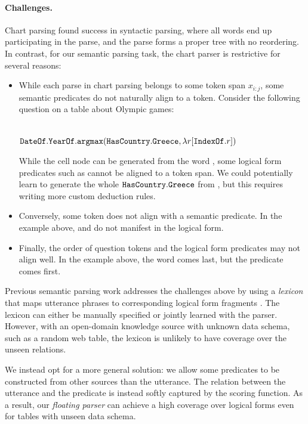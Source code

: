 \paragraph{Challenges.}
Chart parsing found success in syntactic parsing,
where all words end up participating in the parse,
and the parse forms a proper tree with no reordering.
In contrast, for our semantic parsing task,
the chart parser is restrictive for several reasons:
\begin{itemize}
\item
While each parse in chart parsing belongs
to some token span $x_{i:j}$,
some semantic predicates do not naturally align
to a token.
Consider the following question on a table about
Olympic games:
\begin{center}
 \\
${\texttt{Date}}\texttt{Of}.{\texttt{Year}}\texttt{Of}.\texttt{argmax}(\texttt{Has}{\texttt{Country}}.\texttt{Greece}, \lambda r[{\texttt{Index}}\texttt{Of}.r])$
\end{center}
While the cell node  can be generated from
the word , some logical form predicates
such as  cannot be aligned to a token span.
We could potentially learn to generate the whole
$\texttt{Has}{\texttt{Country}}.\texttt{Greece}$ from ,
but this requires writing more custom deduction rules.
\item
Conversely, some token does not align with
a semantic predicate.
In the example above,  and 
do not manifest in the logical form.
\item
Finally, the order of question tokens
and the logical form predicates
may not align well.
In the example above,
the word  comes last,
but the predicate  comes first.
\end{itemize}

Previous semantic parsing work
addresses the challenges above by
using a \emph{lexicon}
that maps utterance phrases
to corresponding logical form fragments
\cite{zettlemoyer07relaxed,kwiatkowski10ccg,kwiatkowski11lex,berant2013freebase}.
The lexicon can either be manually specified
or jointly learned with the parser.
However, with an open-domain knowledge source with unknown data schema,
such as a random web table,
the lexicon is unlikely to have coverage over
the unseen relations.

We instead opt for a more general solution:
we allow some predicates to be constructed from other sources
than the utterance.
The relation between the utterance and the predicate
is instead softly captured by the scoring function.
As a result, our \emph{floating parser}
can achieve a high coverage over logical forms
even for tables with unseen data schema.

